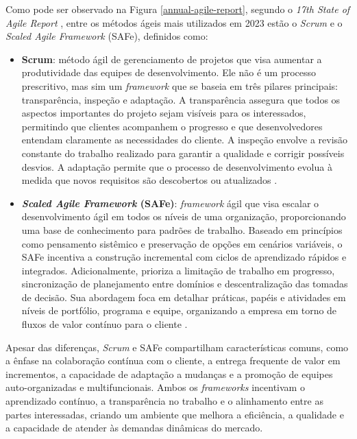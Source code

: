 \documentclass[
	12pt,
	openright,
	twoside,
	a4paper,
	english,
	brazil
	]{abntex2}
\begin{document}
Como pode ser observado na Figura \ref{annual-agile-report}, segundo o \textit{17th State of Agile Report} \cite{17_agile_report}, entre os métodos ágeis mais utilizados em 2023 estão o \textit{Scrum} e o \textit{Scaled Agile Framework} (SAFe), definidos como:
\begin{itemize}
  \item \textbf{Scrum}: método ágil de gerenciamento de projetos que visa aumentar a produtividade das equipes de desenvolvimento. Ele não é um processo prescritivo, mas sim um \textit{framework} que se baseia em três pilares principais: transparência, inspeção e adaptação. A transparência assegura que todos os aspectos importantes do projeto sejam visíveis para os interessados, permitindo que clientes acompanhem o progresso e que desenvolvedores entendam claramente as necessidades do cliente. A inspeção envolve a revisão constante do trabalho realizado para garantir a qualidade e corrigir possíveis desvios. A adaptação permite que o processo de desenvolvimento evolua à medida que novos requisitos são descobertos ou atualizados \cite{wazlawick2019}.
  \item \textbf{\textit{Scaled Agile Framework} (SAFe)}: \textit{framework} ágil que visa escalar o desenvolvimento ágil em todos os níveis de uma organização, proporcionando uma base de conhecimento para padrões de trabalho. Baseado em princípios como pensamento sistêmico e preservação de opções em cenários variáveis, o SAFe incentiva a construção incremental com ciclos de aprendizado rápidos e integrados. Adicionalmente, prioriza a limitação de trabalho em progresso, sincronização de planejamento entre domínios e descentralização das tomadas de decisão. Sua abordagem foca em detalhar práticas, papéis e atividades em níveis de portfólio, programa e equipe, organizando a empresa em torno de fluxos de valor contínuo para o cliente \cite{AgileGuide}.
\end{itemize}

Apesar das diferenças, \textit{Scrum} e SAFe compartilham características comuns, como a ênfase na colaboração contínua com o cliente, a entrega frequente de valor em incrementos, a capacidade de adaptação a mudanças e a promoção de equipes auto-organizadas e multifuncionais. Ambos os \textit{frameworks} incentivam o aprendizado contínuo, a transparência no trabalho e o alinhamento entre as partes interessadas, criando um ambiente que melhora a eficiência, a qualidade e a capacidade de atender às demandas dinâmicas do mercado.

\end{document}
